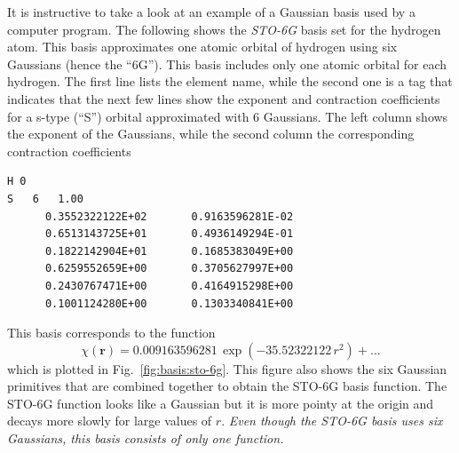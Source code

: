 \documentclass[../Main/chem371-notes.tex]{subfiles}
\begin{document}
It is instructive to take a look at an example of a Gaussian basis used by a computer program.
The following shows the \emph{STO-6G} basis set for the hydrogen atom. This basis approximates one atomic orbital of hydrogen using six Gaussians (hence the ``6G'').
This basis includes only one atomic orbital for each hydrogen.
The first line lists the element name, while the second one is a tag that indicates that the next few lines show the exponent and contraction coefficients for a s-type (``S'') orbital approximated with 6 Gaussians.
The left column shows the exponent of the Gaussians, while the second column the corresponding contraction coefficients
\begin{verbatim}
H 0
S   6   1.00
      0.3552322122E+02       0.9163596281E-02
      0.6513143725E+01       0.4936149294E-01
      0.1822142904E+01       0.1685383049E+00
      0.6259552659E+00       0.3705627997E+00
      0.2430767471E+00       0.4164915298E+00
      0.1001124280E+00       0.1303340841E+00
\end{verbatim}

This basis corresponds to the function
\begin{equation}
\chi(\mathbf{r}) = 
0.009163596281 \, \exp(-35.52322122 \, r^2)
+ \ldots
\end{equation}
which is plotted in Fig.~\ref{fig:basis:sto-6g}.
This figure also shows the six Gaussian primitives that are combined together to obtain the STO-6G basis function.
The STO-6G function looks like a Gaussian but it is more pointy at the origin and decays more slowly for large values of $r$.
\emph{Even though the STO-6G basis uses six Gaussians, this basis consists of only one function.}
\end{document}
